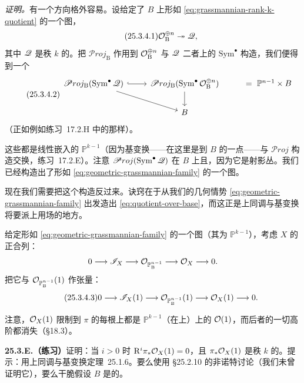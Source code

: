 \emph{证明。}\quad 有一个方向格外容易。设给定了\trScheme{} $B$ 上形如 \eqref{eq:grassmannian-rank-k-quotient} 的一个图，
\begin{equation*}\tag{25.3.4.1}\label{eq:quotient-over-base}
\mathcal{O}_{\mathrm{B}}^{\oplus n}\twoheadrightarrow\mathscr{Q},
\end{equation*}
其中 $\mathscr{Q}$ 是秩 $k$ 的\trLocallyFreeSheaf。把 $\mathscr{P}roj_{\mathrm{B}}$ 作用到 $\mathcal{O}_{\mathrm{B}}^{\oplus n}$ 与 $\mathscr{Q}$ 二者上的 $\mathrm{Sym}^\bullet$ 构造，我们便得到一个\trClosedEmbedding
\begin{equation*}\tag{25.3.4.2}\label{eq:proj-closed-embedding}
\begin{tikzcd}
\mathscr{P}roj_{\mathrm{B}}(\mathrm{Sym}^\bullet\,\scr{Q}) \ar[r, hook] \ar[dr] & \mathscr{P}roj_{\mathrm{B}}(\mathrm{Sym}^\bullet\,\OO_{\mathrm{B}}^{\oplus n}) \ar[d] & =\ \mathbb{P}^{n-1}\times B \\
& B &
\end{tikzcd}
\end{equation*}
（正如例如\mbox{练习~17.2.H} 中的那样）。

这些\trFiber{}都是线性嵌入的 $\mathbb{P}^{k-1}$（因为基变换——在这里是\trPullback{}到 $B$ 的一点——与 $\mathscr{P}roj$ 构造交换，\mbox{练习~17.2.E}）。注意 $\mathscr{P}roj(\mathrm{Sym}^\bullet\,\mathscr{Q})$ 在 $B$ 上\trFlat{}且\trFinitelyPresented，因为它是射影丛。我们已经构造出了形如 \eqref{eq:geometric-grassmannian-family} 的一个图。

现在我们需要把这个构造反过来。诀窍在于从我们的几何情势 \eqref{eq:geometric-grassmannian-family} 出发造出 \eqref{eq:quotient-over-base}，而这正是上同调与基变换将要派上用场的地方。

给定形如 \eqref{eq:geometric-grassmannian-family} 的一个图（其\trFiber{}为 $\mathbb{P}^{k-1}$），考虑 $X$ 的\trClosedSubscheme{}正合列：
\[
0\longrightarrow\mathscr{I}_X\longrightarrow\mathcal{O}_{\mathbb{P}^{n-1}_{\mathrm{B}}}\longrightarrow\mathcal{O}_X\longrightarrow 0.
\]
把它与 $\mathcal{O}_{\mathbb{P}^{n-1}_{\mathrm{B}}}(1)$ 作张量：
\begin{equation*}\tag{25.3.4.3}\label{eq:twisted-ideal-sequence}
0\longrightarrow\mathscr{I}_X(1)\longrightarrow\mathcal{O}_{\mathbb{P}^{n-1}_{\mathrm{B}}}(1)\longrightarrow\mathcal{O}_X(1)\longrightarrow 0.
\end{equation*}

注意，$\mathcal{O}_X(1)$ 限制到 $\pi$ 的每根\trFiber{}上都是 $\mathbb{P}^{k-1}$（在\trResidueField{}上）上的 $\mathcal{O}(1)$，而后者的一切高阶\trCohomology{}都消失（\S18.3）。

\textbf{25.3.E.（练习）}\quad 证明：当 $i>0$ 时 $\mathrm{R}^i\pi_*\mathcal{O}_X(1)=0$，且 $\pi_*\mathcal{O}_X(1)$ 是秩 $k$ 的\trLocallyFreeSheaf。提示：用\mbox{上同调与基变换定理~25.1.6}。要么使用 \S25.2.10 的非诺特讨论（我们未曾证明它），要么干脆假设 $B$ 是\trLocally\trNoether{}的。

